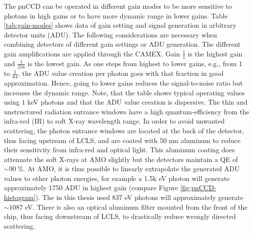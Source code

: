 The pnCCD can be operated in different gain modes to be more sensitive to photons in high gains or to have more dynamic range in lower gains. Table \ref{tab:gain-modes} shows data of gain setting and signal generation in arbitrary detector units (ADU). The following considerations are necessary when combining detectors of different gain settings or ADU generation. The different gain amplifications are applied through the CAMEX. Gain $\frac{1}{1}$ is the highest gain and $\frac{1}{256}$ is the lowest gain. As one steps from highest to lower gains, e.g., from $1$ to $\frac{1}{64}$, the ADU value creation per photon goes with that fraction in good approximation. Hence, going to lower gains reduces the signal-to-noise ratio but increases the dynamic range. Note, that the table shows typical operating values using $1$ keV photons and that the ADU value creation is dispersive. The thin and unstructured radiation entrance windows have a high quantum-efficiency from the infra-red (IR) to soft X-ray wavelength range. In order to avoid unwanted scattering, the photon entrance windows are located at the back of the detector, thus facing upstream of LCLS, and are coated with 50 nm aluminum to reduce their sensitivity from infra-red and optical light. This aluminum coating does attenuate the soft X-rays at AMO slightly but the detectors maintain a QE of $\sim \SI{90}{\percent}$. At AMO, it is thus possible to linearly extrapolate the generated ADU values to other photon energies, for example a 1.5k eV photon will generate approximately 1750 ADU in highest gain (compare Figure \ref{fig:pnCCD-histogram}). The in this thesis used 837 eV photons will approximately generate $\sim 1087$ eV. There is also an optical aluminum filter mounted from the front of the chip, thus facing downstream of LCLS, to drastically reduce wrongly directed scattering.
%
%
%
